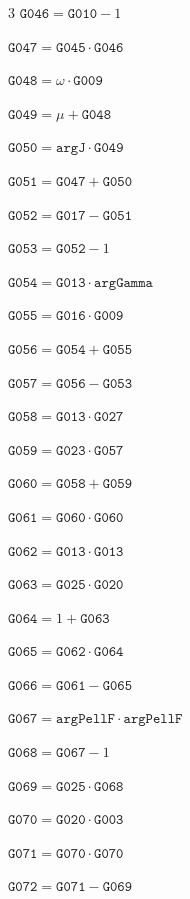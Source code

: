 \documentclass[10pt]{article}
\begin{document}
\begin{multicols}{3}
\noindent $\mathtt{G046}=\mathtt{G010}-1$\par
\noindent $\mathtt{G047}=\mathtt{G045}\cdot \mathtt{G046}$\par
\noindent $\mathtt{G048}=\omega\cdot \mathtt{G009}$\par
\noindent $\mathtt{G049}=\mu+\mathtt{G048}$\par
\noindent $\mathtt{G050}=\mathtt{argJ}\cdot \mathtt{G049}$\par
\noindent $\mathtt{G051}=\mathtt{G047}+\mathtt{G050}$\par
\noindent $\mathtt{G052}=\mathtt{G017}-\mathtt{G051}$\par
\noindent $\mathtt{G053}=\mathtt{G052}-1$\par
\noindent $\mathtt{G054}=\mathtt{G013}\cdot \mathtt{argGamma}$\par
\noindent $\mathtt{G055}=\mathtt{G016}\cdot \mathtt{G009}$\par
\noindent $\mathtt{G056}=\mathtt{G054}+\mathtt{G055}$\par
\noindent $\mathtt{G057}=\mathtt{G056}-\mathtt{G053}$\par
\noindent $\mathtt{G058}=\mathtt{G013}\cdot \mathtt{G027}$\par
\noindent $\mathtt{G059}=\mathtt{G023}\cdot \mathtt{G057}$\par
\noindent $\mathtt{G060}=\mathtt{G058}+\mathtt{G059}$\par
\noindent $\mathtt{G061}=\mathtt{G060}\cdot \mathtt{G060}$\par
\noindent $\mathtt{G062}=\mathtt{G013}\cdot \mathtt{G013}$\par
\noindent $\mathtt{G063}=\mathtt{G025}\cdot \mathtt{G020}$\par
\noindent $\mathtt{G064}=1+\mathtt{G063}$\par
\noindent $\mathtt{G065}=\mathtt{G062}\cdot \mathtt{G064}$\par
\noindent $\mathtt{G066}=\mathtt{G061}-\mathtt{G065}$\par
\noindent $\mathtt{G067}=\mathtt{argPellF}\cdot \mathtt{argPellF}$\par
\noindent $\mathtt{G068}=\mathtt{G067}-1$\par
\noindent $\mathtt{G069}=\mathtt{G025}\cdot \mathtt{G068}$\par
\noindent $\mathtt{G070}=\mathtt{G020}\cdot \mathtt{G003}$\par
\noindent $\mathtt{G071}=\mathtt{G070}\cdot \mathtt{G070}$\par
\noindent $\mathtt{G072}=\mathtt{G071}-\mathtt{G069}$\par

\end{multicols}
\end{document}
